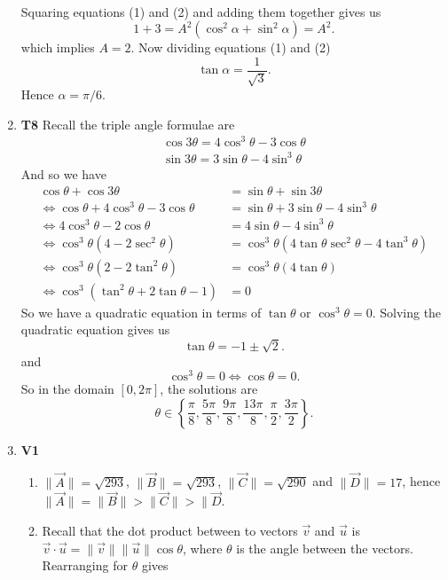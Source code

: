 \documentclass[12pt,oneside]{book}
\begin{document}
\begin{enumerate}
\begin{align*}
        \end{align*} Squaring equations (1) and (2) and adding them together gives us \[
            1 + 3 = A^2 (\cos^2 \alpha + \sin^2 \alpha) = A^2
        .\] which implies $A = 2$. Now dividing equations (1) and (2)  \[
            \tan \alpha = \frac{1}{\sqrt{3}}
        .\] Hence $\alpha = \pi/6$.
        \item \textbf{T8}  Recall the triple angle formulae are \begin{align*}
            \cos 3 \theta = 4 \cos^3 \theta - 3 \cos \theta \\
            \sin 3 \theta = 3 \sin \theta - 4 \sin ^3 \theta
        \end{align*} And so we have \begin{align*}
            \cos \theta + \cos 3 \theta &= \sin \theta + \sin 3 \theta \\
            \iff \cos \theta + 4 \cos^3 \theta - 3\cos \theta &= \sin \theta + 3 \sin \theta - 4 \sin^3 \theta \\
            \iff 4 \cos^3 \theta - 2 \cos \theta &= 4 \sin \theta - 4 \sin^3 \theta \\
            \iff \cos^3 \theta (4 - 2 \sec^2 \theta) &= \cos^3 \theta ( 4 \tan \theta \sec^2 \theta - 4 \tan^3 \theta) \\
            \iff \cos^3 \theta (2 - 2\tan^2 \theta) &= \cos^3 \theta (4 \tan \theta) \\
            \iff \cos^3 (\tan^2 \theta + 2 \tan \theta - 1) &= 0
        \end{align*}
        So we have a quadratic equation in terms of $\tan \theta$ or $\cos^3 \theta = 0$. Solving the quadratic equation gives us \[
            \tan \theta = - 1 \pm \sqrt{2}
        .\] and \[
            \cos^3 \theta = 0 \iff \cos \theta = 0
        .\]  So in the domain $[0, 2\pi]$, the solutions are \[
            \theta \in \left\{\frac{\pi}{8}, \frac{5\pi}{8}, \frac{9\pi}{8}, \frac{13\pi}{8}, \frac{\pi}{2}, \frac{3\pi}{2}\right\} 
        .\] 
        \item \textbf{V1} \begin{enumerate}
            \item $\| \vec{A}\| = \sqrt{293}$, $\| \vec{B}\| = \sqrt{293}$, $\| \vec{C}\| = \sqrt{290}$ and $\| \vec{D}\| = 17$, hence $\| \vec{A} \| = \| \vec{B} \| > \| \vec{C} \| > \| \vec{D}$.
            \item Recall that the dot product between to vectors $\vec{v}$ and $\vec{u}$ is $\vec{v} \cdot \vec{u} = \| \vec{v} \| \| \vec{u} \| \cos \theta$, where $\theta$ is the angle between the vectors. Rearranging for $\theta$ gives \[
\]
\end{enumerate}
\end{enumerate}
\end{document}
